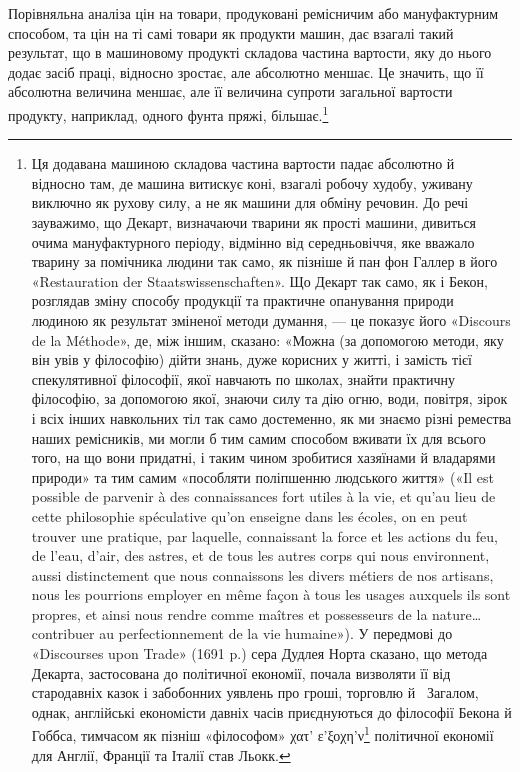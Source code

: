 Порівняльна аналіза цін на товари, продуковані ремісничим
або мануфактурним способом, та цін на ті самі товари як продукти
машин, дає взагалі такий результат, що в машиновому продукті
складова частина вартости, яку до нього додає засіб праці, відносно
зростає, але абсолютно меншає. Це значить, що її абсолютна
величина меншає, але її величина супроти загальної вартости
продукту, наприклад, одного фунта пряжі, більшає.\footnote{
Ця додавана машиною складова частина вартости падає абсолютно
й відносно там, де машина витискує коні, взагалі робочу худобу,
уживану виключно як рухову силу, а не як машини для обміну речовин.
До речі зауважимо, що Декарт, визначаючи тварини як прості машини,
дивиться очима мануфактурного періоду, відмінно від середньовіччя,
яке вважало тварину за помічника людини так само, як пізніше й пан
фон Галлер в його «Restauration der Staatswissenschaften». Що Декарт
так само, як і Бекон, розглядав зміну способу продукції та практичне
опанування природи людиною як результат зміненої методи думання, —
це показує його «Discours de la Méthode», де, між іншим, сказано: «Можна
(за допомогою методи, яку він увів у філософію) дійти знань, дуже корисних
у житті, і замість тієї спекулятивної філософії, якої навчають по школах,
знайти практичну філософію, за допомогою якої, знаючи силу та дію
огню, води, повітря, зірок і всіх інших навкольних тіл так само достеменно,
як ми знаємо різні ремества наших ремісників, ми могли б тим
самим способом вживати їх для всього того, на що вони придатні, і таким
чином зробитися хазяїнами й владарями природи» та тим самим «пособляти
поліпшенню людського життя» («Il est possible de parvenir à des connaissances
fort utiles à la vie, et qu'au lieu de cette philosophie spéculative
qu’on enseigne dans les écoles, on en peut trouver une pratique, par laquelle,
connaissant la force et les actions du feu, de l’eau, d’air, des astres, et de
tous les autres corps qui nous environnent, aussi distinctement que nous
connaissons les divers métiers de nos artisans, nous les pourrions employer
en même façon à tous les usages auxquels ils sont propres, et ainsi nous
rendre comme maîtres et possesseurs de la nature\dots{} contribuer au
perfectionnement de la vie humaine»). У передмові до «Discourses upon Trade»
(1691 p.) сера Дудлея Норта сказано, що метода Декарта, застосована
до політичної економії, почала визволяти її від стародавніх казок і забобонних
уявлень про гроші, торговлю й~ Загалом, однак, англійські
економісти давніх часів приєднуються до філософії Бекона й Гоббса, тимчасом
як пізніш «філософом» χατ’ ε’ξοχη'ν\footnote*{
— переважно. \emph{Ред.}
} політичної економії для Англії,
Франції та Італії став Льокк.
}

